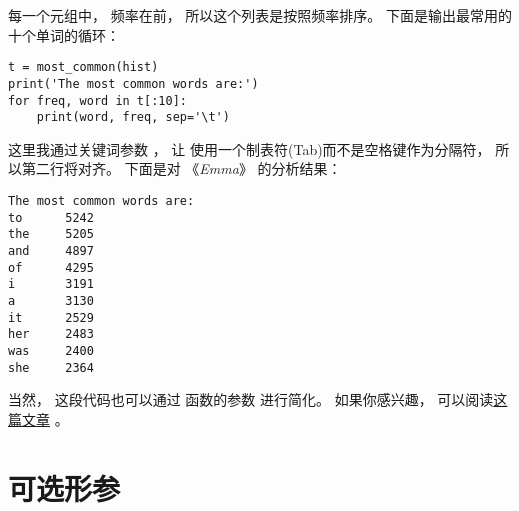 
每一个元组中， 频率在前， 所以这个列表是按照频率排序。  
下面是输出最常用的十个单词的循环：

\begin{lstlisting}
t = most_common(hist)
print('The most common words are:')
for freq, word in t[:10]:
    print(word, freq, sep='\t')
\end{lstlisting}


这里我通过关键词参数 ，  让  使用一个制表符(Tab)而不是空格键作为分隔符，  所以第二行将对齐。    下面是对 《{\em Emma}》 的分析结果：

\begin{lstlisting}
The most common words are:
to      5242
the     5205
and     4897
of      4295
i       3191
a       3130
it      2529
her     2483
was     2400
she     2364
\end{lstlisting}


当然， 这段代码也可以通过  函数的参数  进行简化。  
如果你感兴趣， 可以阅读\href{https://wiki.python.org/moin/HowTo/Sorting}{这篇文章} 。  

\section{可选形参}



